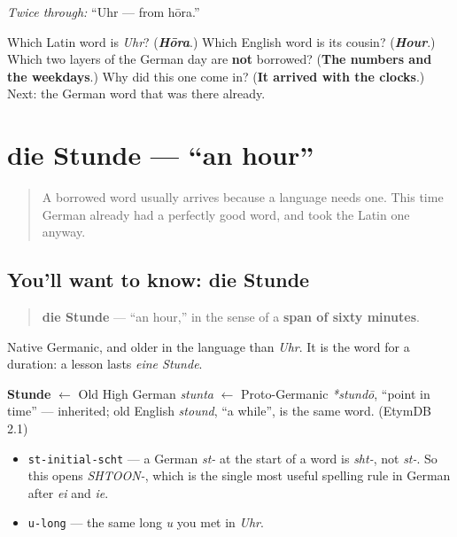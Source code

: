\emph{Twice through:} \textquotedblleft{}Uhr — from hōra.\textquotedblright{}

\begin{tcolorbox}[breakable,colback=teal!4,colframe=teal!35!black,title={Before you move on}]
Which Latin word is \emph{Uhr}? (\emph{\textbf{Hōra}}.) Which English word is its cousin? (\emph{\textbf{Hour}}.) Which two layers of the German day are \textbf{not} borrowed? (\textbf{The numbers and the weekdays}.) Why did this one come in? (\textbf{It arrived with the clocks}.) Next: the German word that was there already.
\end{tcolorbox}
\section[die Stunde]{die Stunde — \textquotedblleft{}an hour\textquotedblright{}}

\label{lesson:GE-C08-stunde}



\begin{quote}
A borrowed word usually arrives because a language needs one. This time German already had a perfectly good word, and took the Latin one anyway.
\end{quote}

\subsection*{You'll want to know: die Stunde}
\begin{quote}
\textbf{die Stunde} — \textquotedblleft{}an hour,\textquotedblright{} in the sense of a \textbf{span of sixty minutes}.
\end{quote}

Native Germanic, and older in the language than \emph{Uhr}. It is the word for a duration: a lesson lasts \emph{eine Stunde}.

\begin{cousinweb}
\textbf{Stunde} $\leftarrow$ Old High German \emph{stunta} $\leftarrow$ Proto-Germanic \emph{*stundō}, \textquotedblleft{}point in time\textquotedblright{} — inherited; old English \emph{stound}, \textquotedblleft{}a while\textquotedblright{}, is the same word. (EtymDB 2.1)
\end{cousinweb}

\begin{sounds}
\begin{itemize}
\raggedright
  \item \texttt{st-initial-scht} — a German \emph{st-} at the start of a word is \emph{sht-}, not \emph{st-}. So this opens \emph{SHTOON-}, which is the single most useful spelling rule in German after \emph{ei} and \emph{ie}.
  \item \texttt{u-long} — the same long \emph{u} you met in \emph{Uhr}.
\end{itemize}
\end{sounds}


